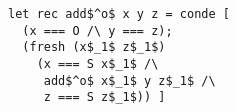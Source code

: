 \begin{figure}[!t]
  \centering
  \begin{minipage}{\columnwidth}
    \begin{lstlisting}[frame=tb]
let rec add$^o$ x y z = conde [
  (x === O /\ y === z);
  (fresh (x$_1$ z$_1$)
    (x === S x$_1$ /\
     add$^o$ x$_1$ y z$_1$ /\
     z === S z$_1$)) ]
    \end{lstlisting}
  \end{minipage}
\end{figure}